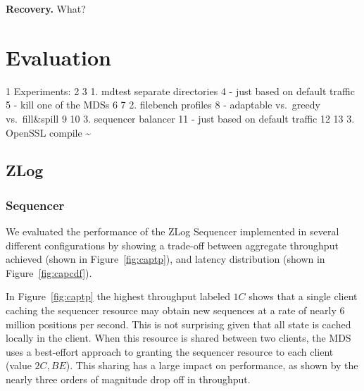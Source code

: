 \documentclass[10pt,twocolumn]{article}
\begin{document}
{\bf Recovery.}
What?

\section{Evaluation}\label{evaluation}

1 Experiments: 2 3 1. mdtest separate directories 4 - just based on
default traffic 5 - kill one of the MDSs 6 7 2. filebench profiles 8 -
adaptable vs.~greedy vs.~fill\&spill 9 10 3. sequencer balancer 11 -
just based on default traffic 12 13 3. OpenSSL compile
\textasciitilde{}\\\label{evaluation}

\subsection{ZLog}

\subsubsection{Sequencer}

We evaluated the performance of the ZLog Sequencer implemented in several
different configurations by showing a trade-off between aggregate throughput
achieved (shown in Figure~\ref{fig:captp}), and latency distribution (shown in
Figure~\ref{fig:capcdf}).

In Figure~\ref{fig:captp} the highest throughput labeled $1C$ shows that a
single client caching the sequencer resource may obtain new sequences at a rate
of nearly 6 million positions per second. This is not surprising given that all
state is cached locally in the client. When this resource is shared between two
clients, the MDS uses a best-effort approach to granting the sequencer resource
to each client (value $2C,BE$). This sharing has a large impact on performance,
as shown by the nearly three orders of magnitude drop off in throughput.
\end{document}
